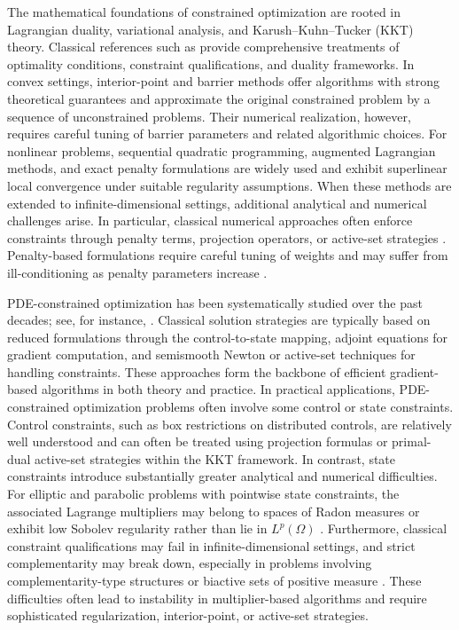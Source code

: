\documentclass{article}
\numberwithin{equation}{section}
\begin{document}
The mathematical foundations of constrained optimization are rooted in Lagrangian duality, variational analysis, and Karush--Kuhn--Tucker (KKT) theory. Classical references such as \cite{bazaraa2006nonlinear,rockafellar1998variational} provide comprehensive treatments of optimality conditions, constraint qualifications, and duality frameworks. In convex settings, interior-point and barrier methods \cite{wright1992interior,forsgren2002interior} offer algorithms with strong theoretical guarantees and approximate the original constrained problem by a sequence of unconstrained problems. Their numerical realization, however, requires careful tuning of barrier parameters and related algorithmic choices. For nonlinear problems, sequential quadratic programming, augmented Lagrangian methods, and exact penalty formulations \cite{boggs1995sequential,birgin2014practical,di1989exact} are widely used and exhibit superlinear local convergence under suitable regularity assumptions. When these methods are extended to infinite-dimensional settings, additional analytical and numerical challenges arise. In particular, classical numerical approaches often enforce constraints through penalty terms, projection operators, or active-set strategies \cite{malitsky2015projected,hintermuller2002primal}. Penalty-based formulations require careful tuning of weights and may suffer from ill-conditioning as penalty parameters increase \cite{bertsekas2014constrained}.

PDE-constrained optimization has been systematically studied over the past decades; see, for instance, \cite{hinze2008optimization,troltzsch2010optimal,hintermuller2010pde}. Classical solution strategies are typically based on reduced formulations through the control-to-state mapping, adjoint equations for gradient computation, and semismooth Newton or active-set techniques for handling constraints. These approaches form the backbone of efficient gradient-based algorithms in both theory and practice. In practical applications, PDE-constrained optimization problems often involve some control or state constraints. Control constraints, such as box restrictions on distributed controls, are relatively well understood and can often be treated using projection formulas or primal-dual active-set strategies within the KKT framework. In contrast, state constraints introduce substantially greater analytical and numerical difficulties. For elliptic and parabolic problems with pointwise state constraints, the associated Lagrange multipliers may belong to spaces of Radon measures or exhibit low Sobolev regularity rather than lie in $L^p(\Omega)$ \cite{hintermuller2006feasible,troltzsch2010optimal}. Furthermore, classical constraint qualifications may fail in infinite-dimensional settings, and strict complementarity may break down, especially in problems involving complementarity-type structures or biactive sets of positive measure \cite{hintermuller2009mathematical}. These difficulties often lead to instability in multiplier-based algorithms and require sophisticated regularization, interior-point, or active-set strategies.
\end{document}
